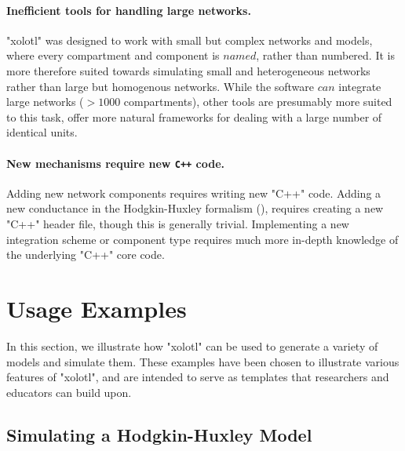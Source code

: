 \documentclass{frontiersSCNS} %
\begin{document}
\paragraph{Inefficient tools for handling large networks.} "xolotl" was designed to work with small but complex networks and models, where every compartment and component is $named$, rather than numbered. It is more therefore suited towards simulating small and heterogeneous networks rather than large but homogenous networks. While the software $can$ integrate large networks ($>1000$ compartments), other tools are presumably more suited to this task, offer more natural frameworks for dealing with a large number of identical units.

\paragraph{New mechanisms require new \texttt{C++} code.} Adding new network components requires writing new "C++" code. Adding a new conductance in the Hodgkin-Huxley formalism (\cite{hodgkinComponentsMembraneConductance1952, hodgkinMeasurementCurrentvoltageRelations1952, hodgkinQuantitativeDescriptionMembrane1952, dayanTheoreticalNeuroscience2001}), requires creating a new "C++" header file, though this is generally trivial. Implementing a new integration scheme or component type requires much more in-depth knowledge of the underlying "C++" core code.

%
%
%
%
%
%

\section{Usage Examples}
\label{usage}

In this section, we illustrate how "xolotl" can be used to generate a variety of models and simulate them. These examples have been chosen to illustrate various features of "xolotl", and are intended to serve as templates that researchers and educators can build upon.

%
%
%
%
%
%

\subsection{Simulating a Hodgkin-Huxley Model}
\end{document}
